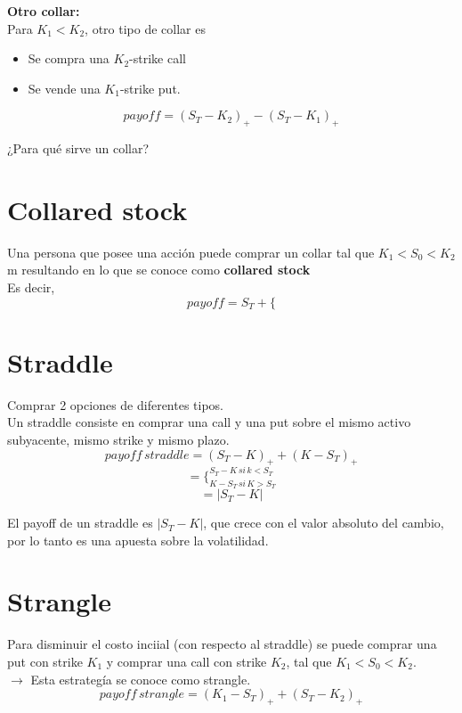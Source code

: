 \documentclass[12pts]{extarticle}
\begin{document}
\textbf{Otro collar:}
\\ Para $K_1<K_2$, otro tipo de collar es
\begin{itemize}
\item Se compra una $K_2$-strike call
\item Se vende una $K_1$-strike put.
\end{itemize} 
$$payoff=(S_T-K_2)_+-(S_T-K_1)_+$$


¿Para qué sirve un collar?
\section{Collared stock}
Una persona que posee una acción puede comprar un collar tal que $K_1<S_0<K_2$m resultando en lo que se conoce como \textbf{collared stock}
\\ 
Es decir, 
$$payoff=S_T+\Bigg \{ $$
\section{Straddle}
Comprar 2 opciones de diferentes tipos. \\ Un straddle consiste en comprar una call y una put sobre el mismo activo subyacente, mismo strike y mismo plazo. 
$$payoff \, straddle=(S_T-K)_+ +(K-S_T)_+$$ 
$$=\Bigg \{_{K-S_T \, si \, K>S_T}^{S_T-K  \, si \, k<S_T}$$
$$=|S_T-K|$$

El payoff de un straddle es $|S_T-K|$, que crece con el valor absoluto del cambio, por lo tanto es una apuesta sobre la volatilidad. 
\section{Strangle}
Para disminuir el costo inciial (con respecto al straddle) se puede comprar una put con strike $K_1$ y comprar una call con strike $K_2$, tal que $K_1<S_0<K_2$.
\\
$\rightarrow$ Esta estrategía se conoce como strangle. 
$$payoff \, strangle=(K_1-S_T)_+ +(S_T-K_2)_+$$ 
\end{document}
